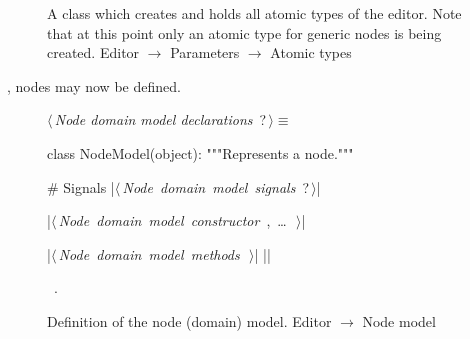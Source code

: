 \documentclass[%
    a4paper,    %
    justified,  %
    nobib,      %
    openany     %
]{tufte-book}
\begin{document}
\begin{figure}
\begin{flushleft}
\begin{minipage}{\linewidth}
\begin{list}{}{\setlength{\itemsep}{-\parsep}\setlength{\itemindent}{-\leftmargin}}
\item{}
\end{list}
\end{minipage}\vspace{4ex}
\end{flushleft}
\caption{A class which creates and holds all atomic types of the editor. Note
  that at this point only an atomic type for generic nodes is being created.
  \newline{}\newline{}Editor $\rightarrow$ Parameters $\rightarrow$ Atomic types}
\label{editor:lst:parameters:atomic-types}
\end{figure}

, nodes may now be defined.

\begin{figure}
\begin{flushleft} \small
\begin{minipage}{\linewidth}\label{scrap66}\raggedright\small
{} $\langle\,${\itshape Node domain model declarations}\nobreak\ {\footnotesize {?}}$\,\rangle\equiv$
\vspace{-1ex}
\begin{pythoncode}
class NodeModel(object):
    """Represents a node."""

    # Signals
    |\hbox{$\langle\,${\itshape Node domain model signals}\nobreak\ {\footnotesize ?}$\,\rangle$}|

    |\hbox{$\langle\,${\itshape Node domain model constructor}\nobreak\ {\footnotesize {}, \ldots\ }$\,\rangle$}|

    |\hbox{$\langle\,${\itshape Node domain model methods}\nobreak\ {\footnotesize {}}$\,\rangle$}|
|\NWsep|
\end{pythoncode}
\vspace{1.5ex}
\footnotesize
\begin{list}{}{\setlength{\itemsep}{-\parsep}\setlength{\itemindent}{-\leftmargin}}
\item \NWtxtMacroRefIn\ .

\item{}
\end{list}
\end{minipage}\vspace{4ex}
\end{flushleft}
\caption{Definition of the node (domain) model.
  \newline{}\newline{}Editor $\rightarrow$ Node model}
\label{editor:lst:node-domain-model}
\end{figure}
\end{document}

